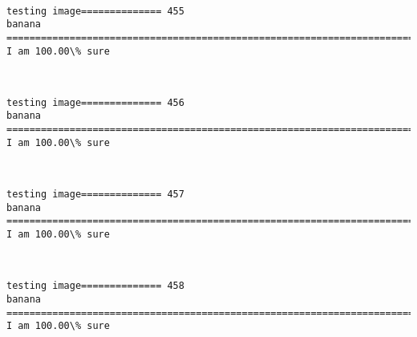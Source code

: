 \documentclass[11pt]{article}
\begin{document}
    \begin{center}
    \end{center}
    { \hspace*{\fill} \\}
    
    \begin{Verbatim}[commandchars=\\\{\}]
testing image============== 455
banana
============================================================================
I am 100.00\% sure

    \end{Verbatim}

    \begin{center}
    \end{center}
    { \hspace*{\fill} \\}
    
    \begin{Verbatim}[commandchars=\\\{\}]
testing image============== 456
banana
============================================================================
I am 100.00\% sure

    \end{Verbatim}

    \begin{center}
    \end{center}
    { \hspace*{\fill} \\}
    
    \begin{Verbatim}[commandchars=\\\{\}]
testing image============== 457
banana
============================================================================
I am 100.00\% sure

    \end{Verbatim}

    \begin{center}
    \end{center}
    { \hspace*{\fill} \\}
    
    \begin{Verbatim}[commandchars=\\\{\}]
testing image============== 458
banana
============================================================================
I am 100.00\% sure

    \end{Verbatim}
\end{document}
